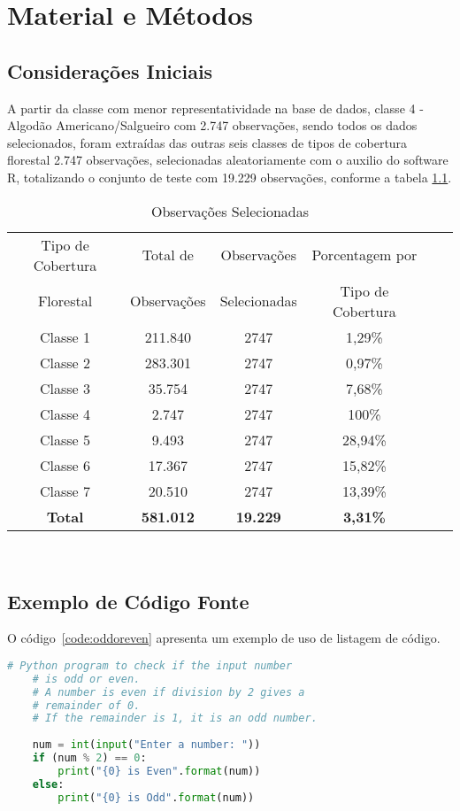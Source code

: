 \chapter{Material e Métodos}

\section{Considerações Iniciais}
A partir da classe com menor representatividade na base de dados, classe 4 - Algodão Americano/Salgueiro com 2.747 observações, sendo todos os dados selecionados, foram extraídas das outras seis classes de tipos de cobertura florestal 2.747 observações, selecionadas aleatoriamente com o auxilio do software R, totalizando o conjunto de teste com 19.229 observações, conforme a tabela \ref{tb:dados}.

\begin{table}[htbp]
\caption{Observações Selecionadas}
\label{tb:dados}
\centering
\setlength{\tabcolsep}{5pt}
\begin{tabular}{cccccc}
\hline
Tipo de Cobertura  &Total de  &Observações  &Porcentagem por \\
Florestal &Observações &Selecionadas &Tipo de Cobertura \\
\hline
Classe 1 &211.840 &2747 &1,29\% \\
Classe 2 &283.301 &2747 &0,97\% \\
Classe 3 &35.754  &2747 &7,68\% \\
Classe 4 &2.747   &2747 &100\% \\
Classe 5 &9.493   &2747 &28,94\% \\
Classe 6 &17.367  &2747 &15,82\% \\
Classe 7 &20.510  &2747 &13,39\% \\
\hline
\textbf{Total} &\textbf{581.012} &\textbf{19.229} &\textbf{3,31\%} \\
\hline
\end{tabular}
\\
\end{table}

\section{Exemplo de Código Fonte}
O código~\ref{code:oddoreven} apresenta um exemplo de uso de listagem de código.

\begin{lstlisting}[caption={Exemplo de código fonte}, language=Python, label=code:oddoreven]
	# Python program to check if the input number
	# is odd or even.
	# A number is even if division by 2 gives a
	# remainder of 0.
	# If the remainder is 1, it is an odd number.
	
	num = int(input("Enter a number: "))
	if (num % 2) == 0:
		print("{0} is Even".format(num))
	else:
		print("{0} is Odd".format(num))
\end{lstlisting}	


